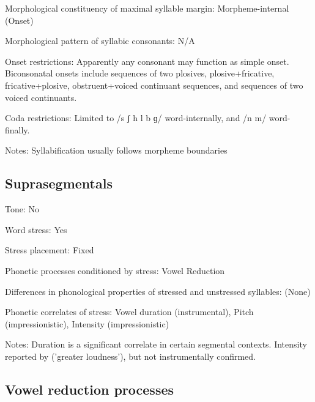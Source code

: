 {\begin{appendixdesc}
\item[Morphological constituency of maximal syllable margin:] Morpheme-internal (Onset)

\item[Morphological pattern of syllabic consonants:] N/A

\item[Onset restrictions:] Apparently any consonant may function as simple onset. Biconsonatal onsets include sequences of two plosives, plosive+fricative, fricative+plosive, obstruent+voiced continuant sequences, and sequences of two voiced continuants.

\item[Coda restrictions:] Limited to /s ʃ h l b ɡ/ word-internally, and /n m/ word-finally.

\item[Notes:] Syllabification usually follows morpheme boundaries
\end{appendixdesc}
\subsection*{Suprasegmentals}
\begin{appendixdesc}
\item[Tone:] No

\item[Word stress:] Yes

\item[Stress placement:] Fixed

\item[Phonetic processes conditioned by stress:] Vowel Reduction

\item[Differences in phonological properties of stressed and unstressed syllables:] (None)

\item[Phonetic correlates of stress:] Vowel duration (instrumental), Pitch (impressionistic), Intensity (impressionistic)

\item[Notes:] Duration is a significant correlate in certain segmental contexts. Intensity reported by \citet{LakotaLanguageConsortium2008} (’greater loudness’), but not instrumentally confirmed.
\end{appendixdesc}
\subsection*{Vowel reduction processes}
\begin{appendixdesc}


\end{appendixdesc}}
